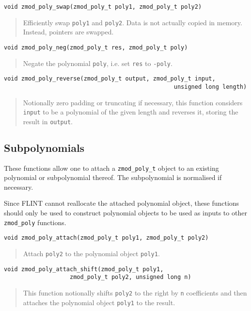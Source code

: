 \documentclass[a4paper,10pt]{article}
\newcommand{\code}{\lstinline}
\begin{document}
\begin{lstlisting}
void zmod_poly_swap(zmod_poly_t poly1, zmod_poly_t poly2)
\end{lstlisting}
\begin{quote}
Efficiently swap \code{poly1} and \code{poly2}. Data is not actually copied in memory. Instead, pointers are swapped.
\end{quote}

\begin{lstlisting}
void zmod_poly_neg(zmod_poly_t res, zmod_poly_t poly)
\end{lstlisting}
\begin{quote}
Negate the polynomial \code{poly}, i.e. set \code{res} to \code{-poly}.
\end{quote}

\begin{lstlisting}
void zmod_poly_reverse(zmod_poly_t output, zmod_poly_t input,
                                                 unsigned long length)
\end{lstlisting}
\begin{quote}
Notionally zero padding or truncating if necessary, this function considers \code{input} to be a polynomial of the given length and reverses it, storing the result in \code{output}.
\end{quote}

\subsection{Subpolynomials}
These functions allow one to attach a \code{zmod_poly_t} object to an existing polynomial or subpolynomial thereof. The subpolynomial is normalised if necessary.

Since FLINT cannot reallocate the attached polynomial object, these functions should only be used to construct polynomial objects to be used as inputs to other \code{zmod_poly} functions.

\begin{lstlisting}
void zmod_poly_attach(zmod_poly_t poly1, zmod_poly_t poly2)
\end{lstlisting}
\begin{quote}
Attach \code{poly2} to the polynomial object \code{poly1}.
\end{quote}

\begin{lstlisting}
void zmod_poly_attach_shift(zmod_poly_t poly1, 
                   zmod_poly_t poly2, unsigned long n)
\end{lstlisting}
\begin{quote}
This function notionally shifts \code{poly2} to the right by \code{n} coefficients and then attaches the polynomial object \code{poly1} to the result.
\end{quote}
\end{document}
